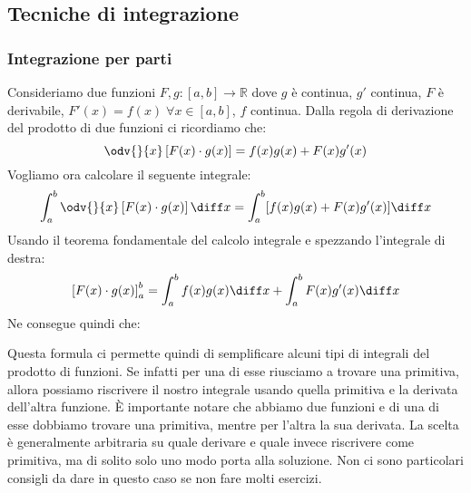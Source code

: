 \subsection{Tecniche di integrazione}
\subsubsection{Integrazione per parti}
Consideriamo due funzioni $F, g:[a,b] \to \mathbb{R}$ dove $g$ è continua, $g'$ continua, $F$ è derivabile, $F'(x) = f(x) \;\forall x \in [a,b]$, $f$ continua. Dalla regola di derivazione del prodotto di due funzioni ci ricordiamo che:
\begin{equation*}
	\odv{}{x} \left[F(x) \cdot g(x)\right] = f(x)g(x) + F(x)g'(x)
\end{equation*}
Vogliamo ora calcolare il seguente integrale:
\begin{equation*}
	\int_a^b \odv{}{x} \left[F(x) \cdot g(x)\right] \diff x = \int_a^b [f(x)g(x) + F(x)g'(x)] \diff x
\end{equation*}
Usando il teorema fondamentale del calcolo integrale e spezzando l'integrale di destra:
\begin{equation*}
	\left[F(x) \cdot g(x)\right]_a^b = \int_a^b f(x)g(x) \diff x + \int_a^b F(x)g'(x) \diff x
\end{equation*}
Ne consegue quindi che:

Questa formula ci permette quindi di semplificare alcuni tipi di integrali del prodotto di funzioni. Se infatti per una di esse riusciamo a trovare una primitiva, allora possiamo riscrivere il nostro integrale usando quella primitiva e la derivata dell'altra funzione. È importante notare che abbiamo due funzioni e di una di esse dobbiamo trovare una primitiva, mentre per l'altra la sua derivata. La scelta è generalmente arbitraria su quale derivare e quale invece riscrivere come primitiva, ma di solito solo uno modo porta alla soluzione. Non ci sono particolari consigli da dare in questo caso se non fare molti esercizi.\\


